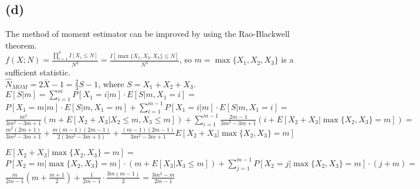 \iffalse
\begin{tikzpicture}
  \begin{axis}[
    xmin = -3,
    xmax = 3,
    xtick = {-3.0, -2.5, ..., 2.5, 3.0}
  ] 
  \addplot +[mark=none] {2*x^3+47*x^2-33*x+12}
  ;

  \end{axis}
\end{tikzpicture}
\fi

\subsection*{(d)}
The method of moment estimator can be improved by using the Rao-Blackwell theorem.\\
$
f(X; N) = 
\frac{\prod_{i=1}^{3}I[X_i \leq N]}{N^3} =
\frac{I[\max\{X_1, X_2, X_3\} \leq N]}{N^3}
$, so
$
m = \max\{X_1, X_2, X_3\}
$
is a sufficient statistic. \\
$
\hat{N}_{MOM} = 2\bar{X}-1 = \frac{2}{3}S-1
$, where
$ S=X_1+X_2+X_3$. \\
$
E[S | m] =
\sum_{i=1}^{m} P[X_1=i | m] \cdot E[S | m, X_1=i] =
$ \\
$
P[X_1=m | m] \cdot E[S | m, X_1=m] + \sum_{i=1}^{m-1} P[X_1=i | m] \cdot E[S | m, X_1=i] =
$ \\
$
\frac{m^2}{3m^2-3m+1}(m+E[X_2+X_3 | X_2 \leq m, X_3 \leq m]) + \sum_{i=1}^{m-1}\frac{2m-1}{3m^2-3m+1} \left(i+
E[X_2+X_3 | \max\{X_2, X_3\}=m]\right) =
$ \\
$
\frac{m^2(2m+1)}{3m^2-3m+1} + \frac{m(m-1)(2m-1)}{2(3m^2-3m+1)} +
\frac{(m-1)(2m-1)}{3m^2-3m+1}E[X_2+X_3 | \max\{X_2, X_3\}=m]
$

$
E[X_2+X_3 | \max\{X_2, X_3\}=m] =
$ \\
$
P[X_2 = m | \max\{X_2, X_3\}=m] \cdot (m+E[X_3 | X_3 \leq m]) +
\sum_{j=1}^{m-1}P[X_2 = j | \max\{X_2, X_3\}=m] \cdot (j+m) =
$ \\
$
\frac{m}{2m-1}(m+\frac{m+1}{2}) +
\frac{1}{2m-1} \cdot \frac{3m(m-1)}{2} =
\frac{3m^2-m}{2m-1}
$

